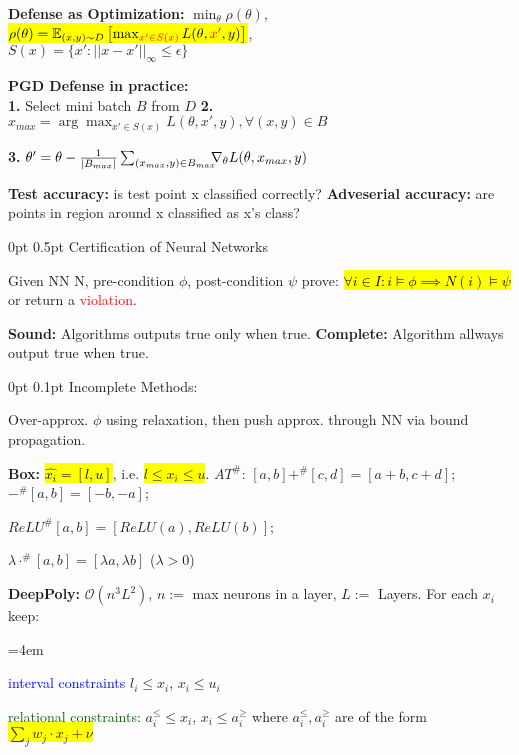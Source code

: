 \documentclass[11pt,landscape,a4paper,fleqn]{article}
\makeatletter
\newcommand{\BigO}{\mathcal{O}}
\renewcommand{\section}{\@startsection{section}{1}{0mm}%
                                {0pt}%
                                {0.5pt}%
                                {\color{myorange}\sffamily\small\bfseries}}
\renewcommand{\subsection}{\@startsection{subsection}{1}{0mm}%
                                {0pt}%
                                {0.1pt}%
                            	{\color{myorange2}\sffamily\small}}
\newcommand{\mhl}[1]{\setlength{\fboxsep}{0pt}\colorbox{yellow}{#1}}
\makeatother
\begin{document}
\begin{multicols*}{4}
\textbf{Defense as Optimization:} $\min_\theta \rho(\theta)$,
 \colorbox{yellow}{$\rho(\theta) = \mathbb{E}_{(x,y) \sim D} \left[ \max_{\textcolor{red}{x' \in S(x)}} L(\theta, \textcolor{red}{x'}, y) \right]$},\\
$S(x) = \{ x': ||x - x'||_\infty \leq \epsilon \}$

\textbf{PGD Defense in practice:}\\
\textbf{1.} Select mini batch $B$ from $D$
\textbf{2.} $x_{max} = \arg\max_{x' \in S(x)} L(\theta, x', y), \forall (x,y) \in B$

\textbf{3.} $\theta' = \theta - \frac{1}{|B_{max}|} \sum_{(x_{max}, y) \in B_{max}} \hspace*{-2mm} \nabla_\theta L(\theta, x_{max}, y)$

\textbf{Test accuracy:} is test point x classified correctly?
\textbf{Adveserial accuracy:} are points in region around x classified as x's class?

\vspace*{1mm}

\section{Certification of Neural Networks}

Given NN N, pre-condition $\phi$, post-condition $\psi$ prove: \hl{$\forall i \in I: i \vDash \phi \implies N(i) \vDash \psi$} or return a \textcolor{red}{violation}.

\textbf{Sound:} Algorithms outputs true only when true.
\textbf{Complete:} Algorithm allways output true when true.

\subsection{Incomplete Methods:}

Over-approx. $\phi$ using relaxation, then push approx. through NN via bound propagation.

\textbf{Box:} \hl{$\hat{x_i} = [l,u]$}, i.e. \mhl{$l \leq x_i \leq u$}. \qquad
$AT^\#$: $[a,b] +^\#[c,d] = [a+b, c+d]$;
$-^\#[a,b] = [-b,-a]$;

$ReLU^\#[a,b] = [ReLU(a), ReLU(b)]$;

$\lambda \cdot^\# [a,b] = [\lambda a, \lambda b]$ ($\lambda > 0$)

\textbf{DeepPoly:} $\BigO(n^3L^2)$, $n:=$ max neurons in a layer, $L:=$ Layers. For each $x_i$ keep:

\begin{compactitem}=4em
	\item \textcolor{blue}{interval constraints} $l_i \leq x_i$, $x_i \leq u_i$
	\item \textcolor{darkgreen}{relational constraints}: $a_i^\leq \leq x_i$, $x_i \leq a_i^\geq$ where $a_i^\leq, a_i^\geq$ are of the form \mhl{$\sum_j w_j \cdot x_j + \nu$}
\end{compactitem}
\vspace*{1mm}


\end{multicols*}
\end{document}
